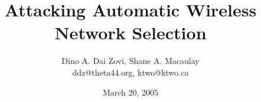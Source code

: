 \documentclass[10pt,twocolumn]{article}
\begin{document}

\title{Attacking Automatic Wireless Network Selection}
\author{
  Dino A. Dai Zovi,
  Shane A. Macaulay \\
  ddz@theta44.org, ktwo@ktwo.ca
}  
\date{March 20, 2005}






\maketitle


\end{document}
